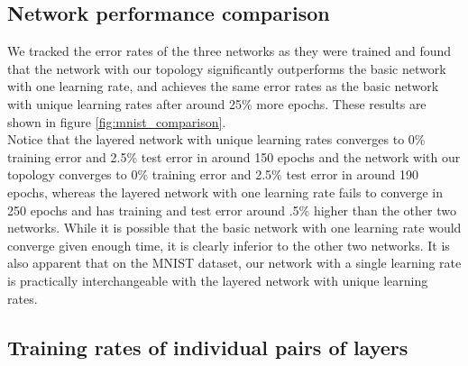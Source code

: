 \documentclass[format=sigconf]{acmart}
\newcommand{\npar}{\\\indent}
\begin{document}
\subsection{Network performance comparison}
\label{sec:network_performance}

We tracked the error rates of the three networks as they were trained and found that the network with our topology significantly outperforms the basic network with one learning rate, and achieves the same error rates as the basic network with unique learning rates after around 25\% more epochs. These results are shown in figure \ref{fig:mnist_comparison}.
\npar
 Notice that the layered network with unique learning rates converges to 0\% training error and 2.5\% test error in around 150 epochs and the network with our topology converges to 0\% training error and 2.5\% test error in around 190 epochs, whereas the layered network with one learning rate fails to converge in 250 epochs and has training and test error around .5\% higher than the other two networks. While it is possible that the basic network with one learning rate would converge given enough time, it is clearly inferior to the other two networks. It is also apparent that on the MNIST dataset, our network with a single learning rate is practically interchangeable with the layered network with unique learning rates.

\subsection{Training rates of individual pairs of layers}
\label{sec:mnist_perlayer}
\end{document}
